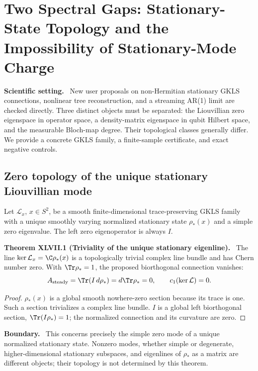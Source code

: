 \documentclass[11pt,a4paper,oneside]{book}
\newcommand{\statement}[3]{\par\medskip\noindent\textbf{#1 #2 (#3).}\ }
\newcommand{\note}[1]{\par\medskip\noindent\textbf{#1}\ }
\begin{document}
\chapter{Two Spectral Gaps: Stationary-State Topology and the Impossibility of Stationary-Mode Charge}
\note{Scientific setting.} New user proposals on non-Hermitian stationary GKLS connections, nonlinear tree reconstruction, and a streaming AR(1) limit are checked directly. Three distinct objects must be separated: the Liouvillian zero eigenspace in operator space, a density-matrix eigenspace in qubit Hilbert space, and the measurable Bloch-map degree. Their topological classes generally differ. We provide a concrete GKLS family, a finite-sample certificate, and exact negative controls.
\section{Zero topology of the unique stationary Liouvillian mode}
Let $\mathcal L_x$, $x\in S^2$, be a smooth finite-dimensional trace-preserving GKLS family with a unique smoothly varying normalized stationary state $\rho_*(x)$ and a simple zero eigenvalue. The left zero eigenoperator is always $I$.
\statement{Theorem}{XLVII.1}{Triviality of the unique stationary eigenline}
The line $\ker\mathcal L_x=\C\rho_*(x)$ is a topologically trivial complex line bundle and has Chern number zero. With $\Tr\rho_*=1$, the proposed biorthogonal connection vanishes:
\[A_{\rm steady}=\Tr(I\,d\rho_*)=d\Tr\rho_*=0,\qquad c_1(\ker\mathcal L)=0.\]
\begin{proof}
$\rho_*(x)$ is a global smooth nowhere-zero section because its trace is one. Such a section trivializes a complex line bundle. $I$ is a global left biorthogonal section, $\Tr(I\rho_*)=1$; the normalized connection and its curvature are zero.
\end{proof}
\note{Boundary.} This concerns precisely the simple zero mode of a unique normalized stationary state. Nonzero modes, whether simple or degenerate, higher-dimensional stationary subspaces, and eigenlines of $\rho_*$ as a matrix are different objects; their topology is not determined by this theorem.
\end{document}
